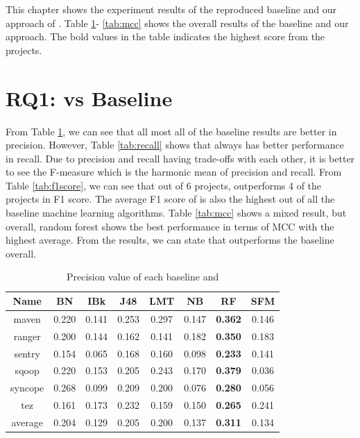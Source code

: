 This chapter shows the experiment results of the reproduced baseline and our approach of {\simfinmo}.
Table \ref{tab:precision}- \ref{tab:mcc} shows the overall results of the baseline and our approach.
The bold values in the table indicates the highest score from the projects.


\section{RQ1: {\simfinmo} vs Baseline}
From Table \ref{tab:precision}, we can see that all most all of the baseline results are better in precision.
However, Table \ref{tab:recall} shows that {\simfinmo} always has better performance in recall.
Due to precision and recall having trade-offs with each other, it is better to see the F-measure which is the harmonic mean of precision and recall.
From Table \ref{tab:f1score}, we can see that out of 6 projects, {\simfinmo} outperforms 4 of the projects in F1 score. 
The average F1 score of {\simfinmo} is also the highest out of all the baseline machine learning algorithms.
Table \ref{tab:mcc} shows a mixed result, but overall, random forest shows the best performance in terms of MCC with the highest average.
From the results, we can state that {\simfinmo} outperforms the baseline overall.

\begin{table}[!ht]
\caption{Precision value of each baseline and \simfinmo}
\centering
\begin{tabular}{|c|c|c|c|c|c|c|c|}
\hline
Name & BN & IBk & J48 & LMT & NB & RF & SFM \\ \hline
maven & 0.220 & 0.141 & 0.253 & 0.297 & 0.147 & \textbf{0.362} & 0.146 \\ \hline
ranger & 0.200 & 0.144 & 0.162 & 0.141 & 0.182 & \textbf{0.350} & 0.183 \\ \hline
sentry & 0.154 & 0.065 & 0.168 & 0.160 & 0.098 & \textbf{0.233} & 0.141 \\ \hline
sqoop & 0.220 & 0.153 & 0.205 & 0.243 & 0.170 & \textbf{0.379} & 0.036 \\ \hline
syncope & 0.268 & 0.099 & 0.209 & 0.200 & 0.076 & \textbf{0.280} & 0.056 \\ \hline
tez & 0.161 & 0.173 & 0.232 & 0.159 & 0.150 & \textbf{0.265} & 0.241 \\ \hline
average & 0.204 & 0.129 & 0.205 & 0.200 & 0.137 & \textbf{0.311} & 0.134 \\ \hline
\end{tabular}%

\label{tab:precision}
\end{table}


